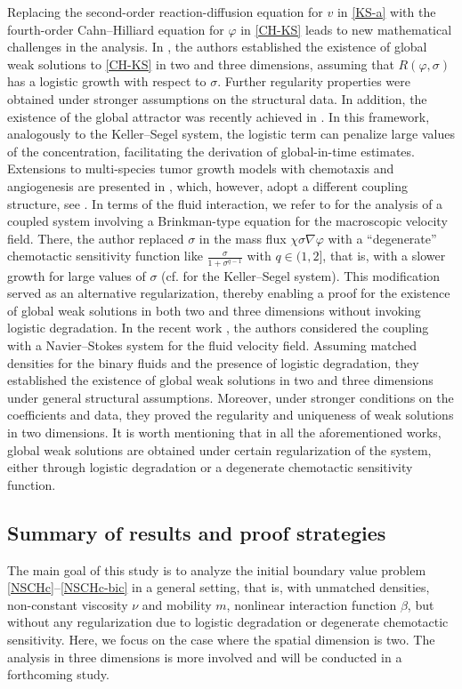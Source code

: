 \documentclass[11pt,reqno]{amsart}
\begin{document}
%
Replacing the second-order reaction-diffusion equation for $v$ in \eqref{KS-a} with the fourth-order Cahn--Hilliard equation for $\varphi$ in \eqref{CH-KS} leads to new mathematical challenges in the analysis. In \cite{RSS2023}, the authors established the existence of global weak solutions to \eqref{CH-KS} in two and three dimensions, assuming that $R(\varphi,\sigma)$ has a logistic growth with respect to $\sigma$. Further regularity properties were obtained under stronger assumptions on the structural data. In addition, the existence of the global attractor was recently achieved in \cite{SS2025}.
In this framework, analogously to the Keller--Segel system, the logistic term can penalize large values of the concentration, facilitating the derivation of global-in-time estimates.
Extensions to multi-species tumor growth models with chemotaxis and angiogenesis are presented in \cite{AS24,CGSS25}, which, however, adopt a different coupling structure, see \cite[Remark 1.1]{AS24}.
In terms of the fluid interaction, we refer to \cite{Sch24} for the analysis of a coupled system involving a Brinkman-type equation for the macroscopic velocity field. There, the author replaced $\sigma$ in the mass flux $\chi\sigma\nabla \varphi$ with a ``degenerate'' chemotactic sensitivity function like $\frac{\sigma}{1+\sigma^{q-1}}$ with $q\in (1,2]$, that is, with a slower growth for large values of $\sigma$ (cf. \cite{HorW2005,WWX18} for the Keller--Segel system). This modification served as an alternative regularization, thereby enabling a proof for the existence of global weak solutions in both two and three dimensions without invoking logistic degradation.
In the recent work \cite{GHW1}, the authors considered the coupling with a Navier--Stokes system for the fluid velocity field. Assuming matched densities for the binary fluids and the presence of logistic degradation, they established the existence of global weak solutions in two and three dimensions under general structural assumptions. Moreover, under stronger conditions on the coefficients and data, they proved the regularity and uniqueness of weak solutions in two dimensions. It is worth mentioning that in all the aforementioned works, global weak solutions are obtained under certain regularization of the system, either through logistic degradation or a degenerate chemotactic sensitivity function.


\subsection{Summary of results and proof strategies}
The main goal of this study is to analyze the initial boundary value problem \eqref{NSCHc}--\eqref{NSCHc-bic} in a general setting, that is, with unmatched densities, non-constant viscosity $\nu$ and mobility $m$, nonlinear interaction function $\beta$, but without any regularization due to logistic degradation or degenerate chemotactic sensitivity. Here, we focus on the case where the spatial dimension is two. The analysis in three dimensions is more involved and will be conducted in a forthcoming study.
\end{document}
